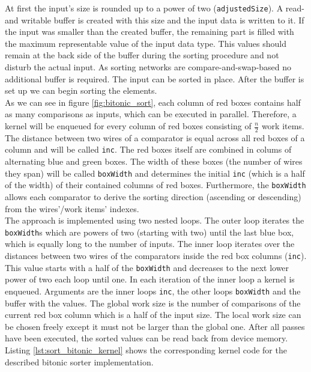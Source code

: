 At first the input's size is rounded up to a power of two (\lstinline!adjustedSize!). A read- and writable buffer is created with this size and the input data is written to it. If the input was smaller than the created buffer, the remaining part is filled with the maximum representable value of the input data type. This values should remain at the back side of the buffer during the sorting procedure and not disturb the actual input. As sorting networks are compare-and-swap-based no additional buffer is required. The input can be sorted in place.
After the buffer is set up we can begin sorting the elements. \\
As we can see in figure \ref{fig:bitonic_sort}, each column of red boxes contains half as many comparisons as inputs, which can be executed in parallel. Therefore, a kernel will be enqueued for every column of red boxes consisting of $\frac{n}{2}$ work items. The distance between two wires of a comparator is equal across all red boxes of a column and will be called \lstinline!inc!. The red boxes itself are combined in colums of alternating blue and green boxes. The width of these boxes (the number of wires they span) will be called \lstinline!boxWidth! and determines the initial \lstinline!inc! (which is a half of the width) of their contained columns of red boxes. Furthermore, the \lstinline!boxWidth! allows each comparator to derive the sorting direction (ascending or descending) from the wires'/work items' indexes. \\
The approach is implemented using two nested loops. The outer loop iterates the \lstinline!boxWidth!s which are powers of two (starting with two) until the last blue box, which is equally long to the number of inputs. The inner loop iterates over the distances between two wires of the comparators inside the red box columns (\lstinline!inc!). This value starts with a half of the \lstinline!boxWidth! and decreases to the next lower power of two each loop until one.
In each iteration of the inner loop a kernel is enqueued. Arguments are the inner loops \lstinline!inc!, the other loops \lstinline!boxWidth! and the buffer with the values. The global work size is the number of comparisons of the current red box column which is a half of the input size. The local work size can be chosen freely except it must not be larger than the global one.
After all passes have been executed, the sorted values can be read back from device memory.
Listing \ref{lst:sort_bitonic_kernel} shows the corresponding kernel code for the described bitonic sorter implementation.

